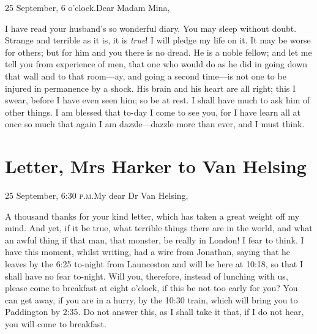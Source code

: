 	\begin{mail}{25 September, 6 o'clock.}{Dear Madam Mina,}

I have read your husband's so wonderful diary. You may sleep without doubt. Strange and terrible as it is, it is \textit{true}! I will pledge my life on it. It may be worse for others; but for him and you there is no dread. He is a noble fellow; and let me tell you from experience of men, that one who would do as he did in going down that wall and to that room—ay, and going a second time—is not one to be injured in permanence by a shock. His brain and his heart are all right; this I swear, before I have even seen him; so be at rest. I shall have much to ask him of other things. I am blessed that to-day I come to see you, for I have learn all at once so much that again I am dazzle—dazzle more than ever, and I must think.

\end{mail}

\begin{letter}
	\clearpage
\end{letter}

\section{Letter, Mrs Harker to Van Helsing}


\begin{mail}{25 September, 6:30 \textsc{p.m.}}{My dear Dr Van Helsing,}

A thousand thanks for your kind letter, which has taken a great weight off my mind. And yet, if it be true, what terrible things there are in the world, and what an awful thing if that man, that monster, be really in London! I fear to think. I have this moment, whilst writing, had a wire from Jonathan, saying that he leaves by the 6:25 to-night from Launceston and will be here at 10:18, so that I shall have no fear to-night. Will you, therefore, instead of lunching with us, please come to breakfast at eight o'clock, if this be not too early for you? You can get away, if you are in a hurry, by the 10:30 train, which will bring you to Paddington by 2:35. Do not answer this, as I shall take it that, if I do not hear, you will come to breakfast.

\end{mail}


